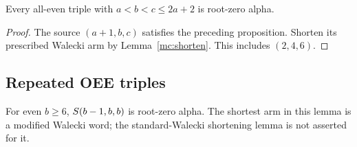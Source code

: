 \begin{corollary}\label{mc:eee-central}
Every all-even triple with $a<b<c\le2a+2$ is root-zero alpha.
\end{corollary}
\begin{proof}
The source $(a+1,b,c)$ satisfies the preceding proposition.
Shorten its prescribed Walecki arm by Lemma~\ref{mc:shorten}.
This includes $(2,4,6)$.
\end{proof}

\subsection{Repeated OEE triples}
\label{mc:oee-repeated-section}

\begin{lemma}\label{mc:oee-near}
For even $b\ge6$, $S\!\left(b-1,b,b\right)$ is root-zero alpha.
The shortest arm in this lemma is a modified Walecki word; the
standard-Walecki shortening lemma is not asserted for it.
\end{lemma}
